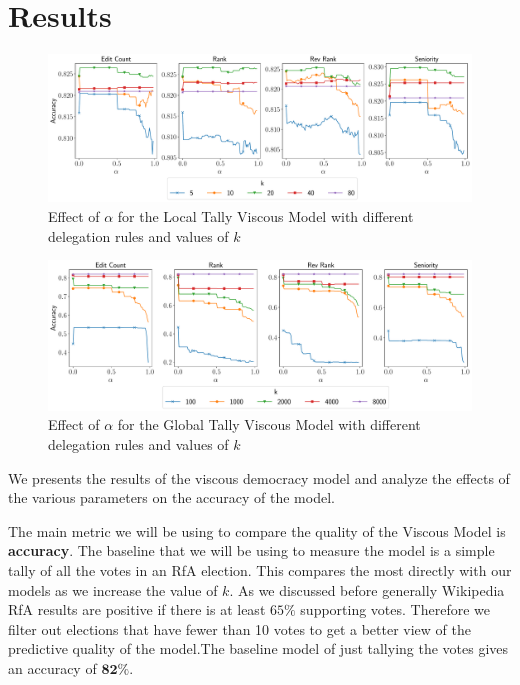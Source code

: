 \section{Results}

\begin{figure}[t]
    \centering
    \includegraphics[width=\linewidth]{images/alpha_local.pdf}
    \caption{Effect of $\alpha$ for the Local Tally Viscous Model with different delegation rules and values of $k$}
    \label{fig:local-alpha}
\end{figure}
\begin{figure}[t]
    \centering
    \includegraphics[width=\linewidth]{images/alpha_global.pdf}
    \caption{Effect of $\alpha$ for the Global Tally Viscous Model with different delegation rules and values of $k$}
    \label{fig:local-alpha}
\end{figure}

\label{sec:results}
We presents the results of the viscous democracy model and analyze the effects of the various parameters on the accuracy of the model.
\smallskip


The main metric we will be using to compare the quality of the Viscous Model is \textbf{accuracy}. The baseline that we will be using to measure the model is a simple tally of all the votes in an RfA election. This compares the most directly with our models as we increase the value of $k$. As we discussed before generally Wikipedia RfA results are positive if there is at least $65\%$ supporting votes. Therefore we filter out elections that have fewer than 10 votes to get a better view of the predictive quality of the model.The baseline model of just tallying the votes gives an accuracy of $\mathbf{82\%}$. 
\smallskip

